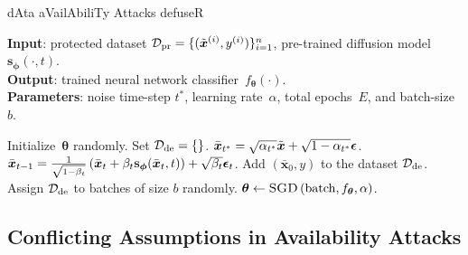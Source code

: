 \documentclass[conference]{IEEEtran}
\theoremstyle{definition}
\theoremstyle{remark}
\theoremstyle{proposition}
\begin{document}
\begin{algorithm}[t!]
	\caption{\label{alg:avatar} dAta aVailAbiliTy Attacks defuseR} 
	\begin{small}
	\textbf{Input}: protected dataset ${\mathcal{D}_{\rm pr}=\{(\tilde{\boldsymbol{x}}^{(i)}, y^{(i)})\}_{i=1}^{n}}$, pre-trained diffusion model~$\mathbf{s}_{\boldsymbol{\phi}}(\cdot, t)$.\vspace*{0.25em}
	\\
	\textbf{Output}: trained neural network classifier~${f_{\boldsymbol{\theta}}(\cdot)}$.\vspace*{0.25em}
	\\
	\textbf{Parameters}: noise time-step $t^{*}$, learning rate~$\alpha$, total epochs~$E$, and batch-size $b$.\vspace*{0.25em}
	\begin{algorithmic}[1]
		\State Initialize~${\boldsymbol{\theta}}$ randomly.
        \State Set $\mathcal{D}_{\rm de} = \{\}$.
		    \State $\small \bar{\boldsymbol{x}}_{t^{*}} =  \sqrt{\alpha_{t^{*}}} \tilde{\boldsymbol{x}} + \sqrt{1 - \alpha_{t^{*}}} \boldsymbol{\epsilon}$.\vspace*{0.15em}
            \State $\small \bar{\boldsymbol{x}}_{t-1}=\frac{1}{\sqrt{1-\beta_{t}}}\left(\bar{\boldsymbol{x}}_{t}+\beta_{t} \mathbf{s}_{\boldsymbol{\phi}}(\bar{\boldsymbol{x}}_{t}, t)\right)+\sqrt{\beta_{t}} \boldsymbol{\epsilon}_{t}$.\vspace*{0.15em}
            \EndFor
            \State Add $(\bar{\boldsymbol{x}}_0, y)$ to the dataset $\mathcal{D}_{\rm de}$.
		\EndFor
        \State Assign $\mathcal{D}_{\rm de}$ to batches of size $b$ randomly.
		    \State $\boldsymbol{\theta}\leftarrow\text{\textsc{SGD}}\left(\mathrm{batch}, f_{\boldsymbol{\theta}}, \alpha\right)$.\vspace*{0.15em}
		\EndFor
		\EndFor
	\end{algorithmic}
	\end{small}
\end{algorithm}

\subsection{Conflicting Assumptions in Availability Attacks}\label{sec:sec:setting_t}
\end{document}
